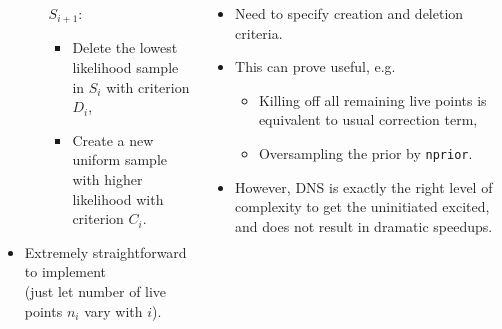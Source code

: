 \documentclass[aspectratio=169]{beamer}
\begin{document}
\begin{frame}
\begin{columns}
\begin{itemize}
\begin{itemize}
                    \item[$S_{i+1}$:] 
                        \begin{itemize}
                            \item Delete the lowest likelihood sample in $S_{i}$ with criterion $D_i$,
                            \item Create  a new uniform sample with higher likelihood with criterion $C_i$.
                        \end{itemize}
                \end{itemize}
            \item Extremely straightforward to implement \\ (just let number of live points $n_i$ vary with $i$).
        \end{itemize}
        \begin{itemize}
            \item Need to specify creation and deletion criteria.
            \item This can prove useful, e.g.
                \begin{itemize}
                    \item Killing off all remaining live points is equivalent to usual correction term,
                    \item Oversampling the prior by \texttt{nprior}.
                \end{itemize}
            \item However, DNS is exactly the right level of complexity to get the uninitiated excited, and does not result in dramatic speedups.
        \end{itemize}
    \end{columns}
\end{frame}
\end{document}
